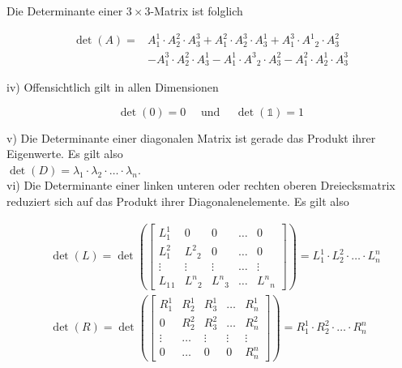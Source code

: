 \documentclass[10pt]{article}
\begin{document}
Die Determinante einer $3 \times 3$-Matrix ist folglich


\begin{align*}
\operatorname{det}(A)= & A_{1}^{1} \cdot A_{2}^{2} \cdot A_{3}^{3}+A_{1}^{2} \cdot A_{2}^{3} \cdot A_{3}^{1}+A_{1}^{3} \cdot A^{1}{ }_{2} \cdot A_{3}^{2} \\
& -A_{1}^{3} \cdot A_{2}^{2} \cdot A_{3}^{1}-A_{1}^{1} \cdot A^{3}{ }_{2} \cdot A_{3}^{2}-A_{1}^{2} \cdot A_{2}^{1} \cdot A_{3}^{3} \tag{6.112}
\end{align*}


iv) Offensichtlich gilt in allen Dimensionen


\begin{equation*}
\operatorname{det}(0)=0 \quad \text { und } \quad \operatorname{det}(\mathbb{1})=1 \tag{6.113}
\end{equation*}


v) Die Determinante einer diagonalen Matrix ist gerade das Produkt ihrer Eigenwerte. Es gilt also\\
$\operatorname{det}(D)=\lambda_{1} \cdot \lambda_{2} \cdot \ldots \cdot \lambda_{n}$.\\
vi) Die Determinante einer linken unteren oder rechten oberen Dreiecksmatrix reduziert sich auf das Produkt ihrer Diagonalenelemente. Es gilt also


\begin{align*}
& \operatorname{det}(L)=\operatorname{det}\left(\left[\begin{array}{ccccc}
L_{1}^{1} & 0 & 0 & \ldots & 0 \\
L_{1}^{2} & L^{2}{ }_{2} & 0 & \ldots & 0 \\
\vdots & \vdots & \vdots & \ldots & \vdots \\
L_{1}{ }_{1} & L^{n}{ }_{2} & L^{n}{ }_{3} & \ldots & L^{n}{ }_{n}
\end{array}\right]\right)=L_{1}^{1} \cdot L_{2}^{2} \cdot \ldots \cdot L_{n}^{n}  \tag{6.115}\\
& \operatorname{det}(R)=\operatorname{det}\left(\left[\begin{array}{ccccc}
R_{1}^{1} & R_{2}^{1} & R_{3}^{1} & \ldots & R_{n}^{1} \\
0 & R_{2}^{2} & R_{3}^{2} & \ldots & R_{n}^{2} \\
\vdots & \ldots & \vdots & \vdots & \vdots \\
0 & \ldots & 0 & 0 & R_{n}^{n}
\end{array}\right]\right)=R_{1}^{1} \cdot R_{2}^{2} \cdot \ldots \cdot R_{n}^{n} \tag{6.116}
\end{align*}
\end{document}
